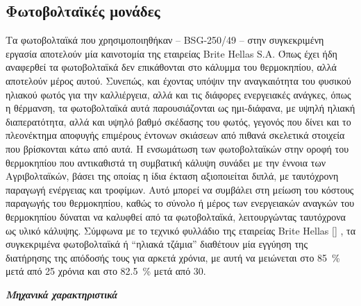 \documentclass[12pt, a4paper]{report} %
\DeclareRobustCommand{\lcitep}[1]{%
  \english{[\cite{#1}]}%
}
\newcommand{\english}{\foreignlanguage{english}}
\begin{document}
\subsection{Φωτοβολταϊκές μονάδες}\label{sub_PVs}
Τα φωτοβολταϊκά που χρησιμοποιηθήκαν – \english{BSG-250/49} – στην συγκεκριμένη εργασία αποτελούν μία καινοτομία της 
εταιρείας \english{Brite Hellas S.A.} Όπως έχει ήδη αναφερθεί τα φωτοβολταϊκά δεν επικάθονται στο κάλυμμα του θερμοκηπίου, 
αλλά αποτελούν μέρος αυτού. Συνεπώς, και έχοντας υπόψιν την αναγκαιότητα του φυσικού ηλιακού φωτός για την καλλιέργεια, 
αλλά και τις διάφορες ενεργειακές ανάγκες, όπως η θέρμανση, τα φωτοβολταϊκά αυτά παρουσιάζονται ως ημι-διάφανα, με υψηλή ηλιακή 
διαπερατότητα, αλλά και υψηλό βαθμό σκέδασης του φωτός, γεγονός που δίνει και το πλεονέκτημα αποφυγής επιμέρους έντονων 
σκιάσεων από πιθανά σκελετικά στοιχεία που βρίσκονται κάτω από αυτά. Η ενσωμάτωση των φωτοβολταϊκών στην οροφή του 
θερμοκηπίου που αντικαθιστά τη συμβατική κάλυψη συνάδει με την έννοια των Αγριβολταϊκών, βάσει 
της οποίας η ίδια έκταση αξιοποιείται διπλά, με ταυτόχρονη παραγωγή ενέργειας και τροφίμων. Αυτό μπορεί να συμβάλει στη 
μείωση του κόστους παραγωγής του θερμοκηπίου, καθώς το σύνολο ή μέρος των ενεργειακών αναγκών του θερμοκηπίου δύναται να 
καλυφθεί από τα φωτοβολταϊκά, λειτουργώντας ταυτόχρονα ως υλικό κάλυψης. Σύμφωνα με το τεχνικό φυλλάδιο της εταιρείας 
\english{Brite Hellas} \lcitep{diataksi_bib6}, τα συγκεκριμένα φωτοβολταϊκά ή “ηλιακά τζάμια” διαθέτουν 
μία εγγύηση της διατήρησης της απόδοσής τους για αρκετά χρόνια, με αυτή να μειώνεται στο \SI{85}{\percent} μετά από 25 
χρόνια και στο \SI{82,5}{\percent} μετά από 30.

\vspace{0.4cm}

\noindent \textit{\textbf{Μηχανικά χαρακτηριστικά}}

\vspace{0.2cm}
\end{document}
